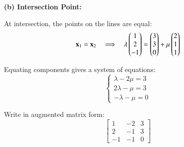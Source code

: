 \documentclass{beamer}
\begin{document}
\begin{frame}
\textbf{(b) Intersection Point:} 

At intersection, the points on the lines are equal:
\[
\mathbf{x}_1 = \mathbf{x}_2 \quad \Longrightarrow \quad
\lambda\begin{pmatrix}1\\2\\-1\end{pmatrix} = \begin{pmatrix}3\\3\\0\end{pmatrix} + \mu\begin{pmatrix}2\\1\\1\end{pmatrix}
\]

Equating components gives a system of equations:
\[
\begin{cases}
\lambda - 2 \mu = 3 \\[1mm]
2 \lambda - \mu = 3 \\[1mm]
- \lambda - \mu = 0
\end{cases}
\]

Write in augmented matrix form:
\[
\left[\begin{array}{rr|r}
1 & -2 & 3 \\[1mm]
2 & -1 & 3 \\[1mm]
-1 & -1 & 0
\end{array}\right]
\]  
\end{frame}
\end{document}
